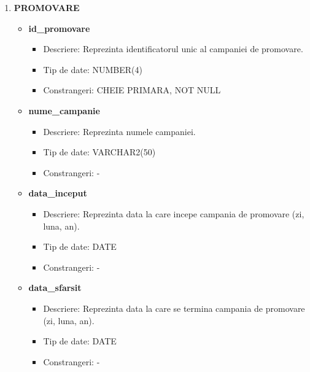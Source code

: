 \begin{enumerate}
\begin{itemize}
    \end{itemize}

    \vspace{0.5cm}


    \item \textbf{PROMOVARE}
    \begin{itemize}
    
        \item \textbf{id\_promovare }
                \begin{itemize}
                    \item Descriere: Reprezinta identificatorul unic al campaniei de promovare.
                    \item Tip de date: NUMBER(4)
                    \item Constrangeri: CHEIE PRIMARA, NOT NULL
                \end{itemize}
                
        \item \textbf{nume\_campanie}
                \begin{itemize}
                    \item Descriere: Reprezinta numele campaniei.
                    \item Tip de date: VARCHAR2(50)
                    \item Constrangeri: -
                \end{itemize}

        \item \textbf{data\_inceput}
                \begin{itemize}
                    \item Descriere: Reprezinta data la care incepe campania de promovare (zi, luna, an).
                    \item Tip de date: DATE
                    \item Constrangeri: -
                \end{itemize}

        \item \textbf{data\_sfarsit}
                \begin{itemize}
                    \item Descriere: Reprezinta data la care se termina campania de promovare (zi, luna, an).
                    \item Tip de date: DATE
                    \item Constrangeri: -
                \end{itemize}
    \end{itemize}


\end{enumerate}
